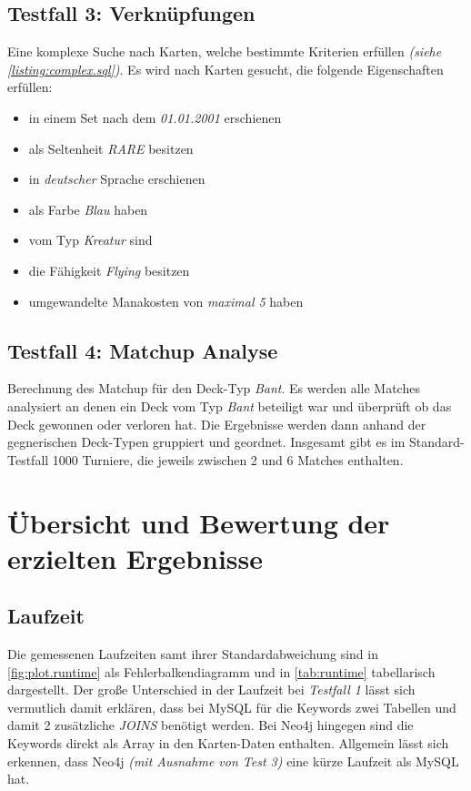 \subsection{Testfall 3: Verknüpfungen}
Eine komplexe Suche nach Karten, welche bestimmte Kriterien erfüllen \emph{(siehe \ref{listing:complex.sql})}. Es wird nach Karten gesucht, die folgende Eigenschaften erfüllen:
\begin{itemize}
    \item in einem Set nach dem \emph{01.01.2001} erschienen
    \item als Seltenheit \emph{RARE} besitzen
    \item in \emph{deutscher} Sprache erschienen
    \item als Farbe \emph{Blau} haben
    \item vom Typ \emph{Kreatur} sind
    \item die Fähigkeit \emph{Flying} besitzen
    \item umgewandelte Manakosten von \emph{maximal 5} haben
 \end{itemize} 

\subsection{Testfall 4: Matchup Analyse}
Berechnung des Matchup für den Deck-Typ \emph{Bant}. Es werden alle Matches analysiert an denen ein Deck vom Typ \emph{Bant} beteiligt war und überprüft ob das Deck gewonnen oder verloren hat. Die Ergebnisse werden dann anhand der gegnerischen Deck-Typen gruppiert und geordnet. Insgesamt gibt es im Standard-Testfall 1000 Turniere, die jeweils zwischen 2 und 6 Matches enthalten.  


\section{Übersicht und Bewertung der erzielten Ergebnisse}
\subsection{Laufzeit}
Die gemessenen Laufzeiten samt ihrer Standardabweichung sind in \autoref{fig:plot.runtime} als Fehlerbalkendiagramm und in \autoref{tab:runtime} tabellarisch dargestellt.
Der große Unterschied in der Laufzeit bei \emph{Testfall 1} lässt sich vermutlich damit erklären, dass bei MySQL für die Keywords zwei Tabellen und damit 2 zusätzliche \emph{JOINS} benötigt werden. Bei Neo4j hingegen sind die Keywords direkt als Array in den Karten-Daten enthalten.
Allgemein lässt sich erkennen, dass Neo4j \emph{(mit Ausnahme von Test 3)} eine kürze Laufzeit als MySQL hat.

